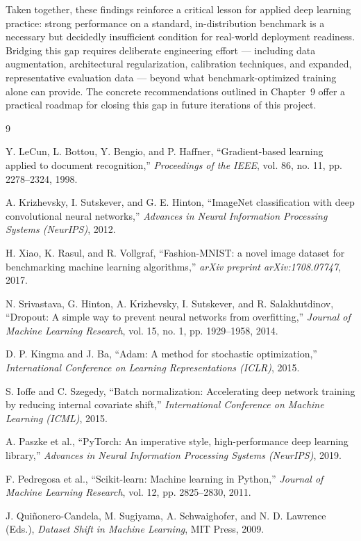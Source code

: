 \documentclass[12pt,a4paper]{report}
\begin{document}
Taken together, these findings reinforce a critical lesson for applied deep learning practice: strong performance on a standard, in-distribution benchmark is a necessary but decidedly insufficient condition for real-world deployment readiness. Bridging this gap requires deliberate engineering effort — including data augmentation, architectural regularization, calibration techniques, and expanded, representative evaluation data — beyond what benchmark-optimized training alone can provide. The concrete recommendations outlined in Chapter~9 offer a practical roadmap for closing this gap in future iterations of this project.

\begin{thebibliography}{9}

Y. LeCun, L. Bottou, Y. Bengio, and P. Haffner, ``Gradient-based learning applied to document recognition,'' \emph{Proceedings of the IEEE}, vol. 86, no. 11, pp. 2278--2324, 1998.

A. Krizhevsky, I. Sutskever, and G. E. Hinton, ``ImageNet classification with deep convolutional neural networks,'' \emph{Advances in Neural Information Processing Systems (NeurIPS)}, 2012.

H. Xiao, K. Rasul, and R. Vollgraf, ``Fashion-MNIST: a novel image dataset for benchmarking machine learning algorithms,'' \emph{arXiv preprint arXiv:1708.07747}, 2017.

N. Srivastava, G. Hinton, A. Krizhevsky, I. Sutskever, and R. Salakhutdinov, ``Dropout: A simple way to prevent neural networks from overfitting,'' \emph{Journal of Machine Learning Research}, vol. 15, no. 1, pp. 1929--1958, 2014.

D. P. Kingma and J. Ba, ``Adam: A method for stochastic optimization,'' \emph{International Conference on Learning Representations (ICLR)}, 2015.

S. Ioffe and C. Szegedy, ``Batch normalization: Accelerating deep network training by reducing internal covariate shift,'' \emph{International Conference on Machine Learning (ICML)}, 2015.

A. Paszke et al., ``PyTorch: An imperative style, high-performance deep learning library,'' \emph{Advances in Neural Information Processing Systems (NeurIPS)}, 2019.

F. Pedregosa et al., ``Scikit-learn: Machine learning in Python,'' \emph{Journal of Machine Learning Research}, vol. 12, pp. 2825--2830, 2011.

J. Quiñonero-Candela, M. Sugiyama, A. Schwaighofer, and N. D. Lawrence (Eds.), \emph{Dataset Shift in Machine Learning}, MIT Press, 2009.

\end{thebibliography}
\end{document}
